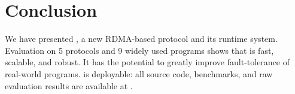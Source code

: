 \section{Conclusion}\label{sec:conclusion}

We have presented \xxx, a new RDMA-based \paxos protocol and its runtime 
system. Evaluation on 5 \paxos protocols and 9 widely used programs 
shows that \xxx is fast, scalable, and robust. It has the potential to greatly 
improve fault-tolerance of real-world programs. \xxx is deployable: all 
source code, benchmarks, and raw evaluation results are 
available at \github.
